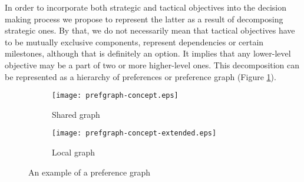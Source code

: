 



In order to incorporate both strategic and tactical objectives into the decision making process we propose to represent
the latter as a result of decomposing strategic ones. By that, we do not necessarily mean that tactical objectives have
to be mutually exclusive components, represent dependencies or certain milestones, although that is definitely an
option. It implies that any lower-level objective may be a part of two or more higher-level ones. This decomposition can
be represented as a hierarchy of preferences or preference graph (Figure \ref{fig:prefgraph-concept-shared}).

\begin{figure}[hbt!]
    \centering
    \begin{subfigure}{.45\linewidth}
        \texttt{[image: prefgraph-concept.eps]}
        \caption{Shared graph}\label{fig:prefgraph-concept-shared}
    \end{subfigure}
    \begin{subfigure}{.45\linewidth}
        \texttt{[image: prefgraph-concept-extended.eps]}
        \caption{Local graph}\label{fig:prefgraph-concept-local}
    \end{subfigure}

    \caption{\small An example of a preference graph}
    \label{fig:prefgraph-concept}
\end{figure}

